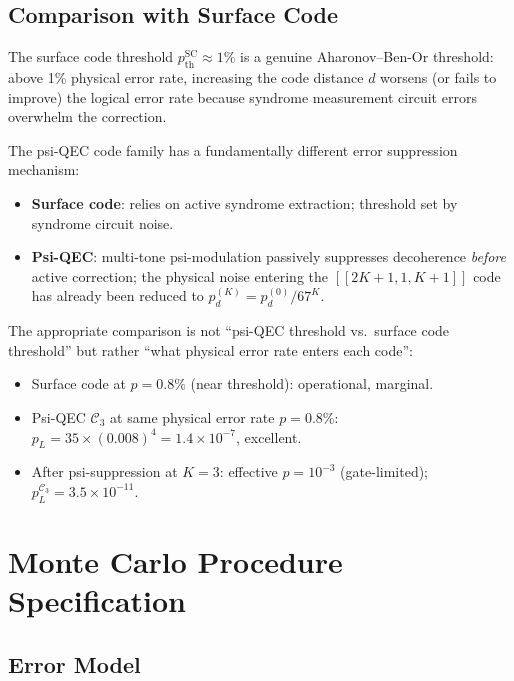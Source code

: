 \documentclass[11pt]{article}
\theoremstyle{definition}
\theoremstyle{remark}
\begin{document}
\subsection{Comparison with Surface Code}
\label{sec:surface-comparison}

The surface code threshold $p_{\mathrm{th}}^{\mathrm{SC}} \approx 1\%$ is a
genuine Aharonov--Ben-Or threshold: above 1\% physical error rate, increasing
the code distance $d$ worsens (or fails to improve) the logical error rate
because syndrome measurement circuit errors overwhelm the correction.

The psi-QEC code family has a fundamentally different error suppression mechanism:
\begin{itemize}
  \item \textbf{Surface code}: relies on active syndrome extraction; threshold
    set by syndrome circuit noise.
  \item \textbf{Psi-QEC}: multi-tone psi-modulation passively suppresses decoherence
    \emph{before} active correction; the physical noise entering the $[[2K+1,1,K+1]]$
    code has already been reduced to $p_d^{(K)} = p_d^{(0)}/67^K$.
\end{itemize}

The appropriate comparison is not ``psi-QEC threshold vs.\ surface code threshold''
but rather ``what physical error rate enters each code'':
\begin{itemize}
  \item Surface code at $p = 0.8\%$ (near threshold): operational, marginal.
  \item Psi-QEC $\mathcal{C}_3$ at same physical error rate $p = 0.8\%$:
    $p_L = 35\times(0.008)^4 = 1.4\times10^{-7}$, excellent.
  \item After psi-suppression at $K=3$: effective $p = 10^{-3}$ (gate-limited);
    $p_L^{\mathcal{C}_3} = 3.5\times10^{-11}$.
\end{itemize}

\section{Monte Carlo Procedure Specification}
\label{sec:monte-carlo}

\subsection{Error Model}
\label{sec:error-model}
\end{document}
